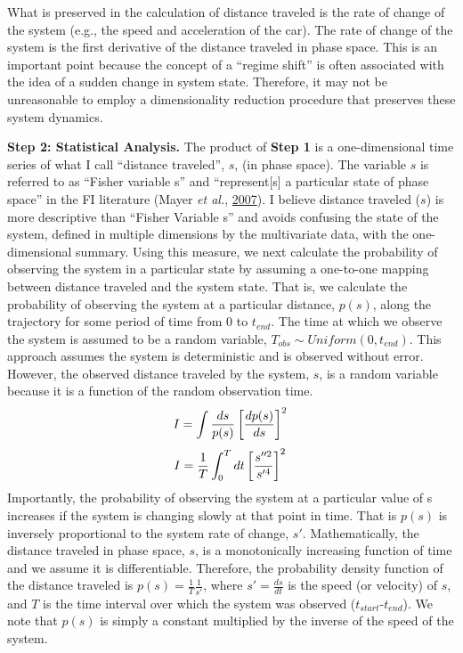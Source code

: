 \documentclass[12pt,twoside,openany]{reedthesis}
\begin{document}
What is preserved in the calculation of distance traveled is the rate of change of the system (e.g., the speed and acceleration of the car). The rate of change of the system is the first derivative of the distance traveled in phase space. This is an important point because the concept of a ``regime shift'' is often associated with the idea of a sudden change in system state. Therefore, it may not be unreasonable to employ a dimensionality reduction procedure that preserves these system dynamics.

\textbf{Step 2: Statistical Analysis.} The product of \textbf{Step 1} is a one-dimensional time series of what I call ``distance traveled'', \(s\), (in phase space). The variable \(s\) is referred to as ``Fisher variable s'' and ``represent{[}s{]} a particular state of phase space'' in the FI literature (Mayer \emph{et al.}, \protect\hyperlink{ref-mayer_applications_2007}{2007}). I believe distance traveled (\(s\)) is more descriptive than ``Fisher Variable s'' and avoids confusing the state of the system, defined in multiple dimensions by the multivariate data, with the one-dimensional summary. Using this measure, we next calculate the probability of observing the system in a particular state by assuming a one-to-one mapping between distance traveled and the system state. That is, we calculate the probability of observing the system at a particular distance, \(p(s)\), along the trajectory for some period of time from 0 to \(t_{end}\). The time at which we observe the system is assumed to be a random variable, \(T_{obs} \sim Uniform(0,t_{end})\). This approach assumes the system is deterministic and is observed without error. However, the observed distance traveled by the system, \(s\), is a random variable because it is a function of the random observation time.
\begin{equation} 
    I = \int \frac{ds}{p(s)}\left[\frac{dp(s)}{ds}\right]^2  \\
    \label{eq:fiAdapted}
\end{equation}
\begin{equation}
    I=\frac{1}{T}\int_0^Tdt\left[\frac{s''^2}{s'^4}\right]^2 \\
  \label{eq:fiDerivs}
\end{equation}
Importantly, the probability of observing the system at a particular value of s increases if the system is changing slowly at that point in time. That is \(p(s)\) is inversely proportional to the system rate of change, \(s'\). Mathematically, the distance traveled in phase space, \(s\), is a monotonically increasing function of time and we assume it is differentiable. Therefore, the probability density function of the distance traveled is \(p(s)=\frac{1}{T}\frac{1}{s'}\), where \(s'=\frac{ds}{dt}\) is the speed (or velocity) of \(s\), and \(T\) is the time interval over which the system was observed (\(t_{start}\)-\(t_{end}\)). We note that \(p(s)\) is simply a constant multiplied by the inverse of the speed of the system.
\end{document}
